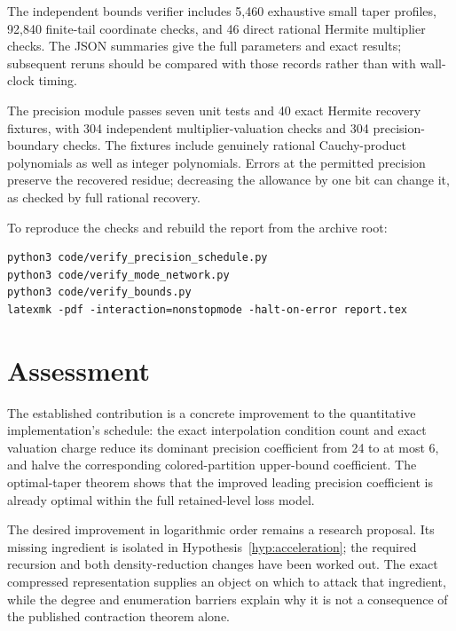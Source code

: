 \documentclass[11pt,letterpaper]{article}
\numberwithin{equation}{section}
\theoremstyle{definition}
\theoremstyle{remark}
\begin{document}
The independent bounds verifier includes 5,460 exhaustive small taper
profiles, 92,840 finite-tail coordinate checks, and 46 direct rational
Hermite multiplier checks. The JSON summaries give the full parameters
and exact results; subsequent reruns should be compared with those
records rather than with wall-clock timing.

The precision module passes seven unit tests and 40 exact Hermite
recovery fixtures, with 304 independent multiplier-valuation checks and
304 precision-boundary checks. The fixtures include genuinely rational
Cauchy-product polynomials as well as integer polynomials. Errors at the
permitted precision preserve the recovered residue; decreasing the
allowance by one bit can change it, as checked by full rational recovery.

To reproduce the checks and rebuild the report from the archive root:
\begin{lstlisting}
python3 code/verify_precision_schedule.py
python3 code/verify_mode_network.py
python3 code/verify_bounds.py
latexmk -pdf -interaction=nonstopmode -halt-on-error report.tex
\end{lstlisting}

\section{Assessment}

The established contribution is a concrete improvement to the
quantitative implementation's schedule: the exact interpolation condition
count and exact valuation charge reduce its dominant precision coefficient
from 24 to at most 6, and halve the corresponding colored-partition
upper-bound coefficient. The optimal-taper theorem shows that the improved
leading precision coefficient is already optimal within the full
retained-level loss model.

The desired improvement in logarithmic order remains a research proposal.
Its missing ingredient is isolated in Hypothesis~\ref{hyp:acceleration};
the required recursion and both density-reduction changes have been worked
out. The exact compressed representation supplies an object on which to
attack that ingredient, while the degree and enumeration barriers explain
why it is not a consequence of the published contraction theorem alone.
\end{document}
